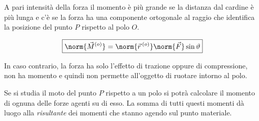 \FloatBarrier
A pari intensità della forza il momento è più grande se la distanza dal cardine è più lunga e c'è se la forza ha una componente ortogonale al raggio che identifica la posizione del punto $P$ rispetto al polo $O$.

\[
	\boxed{\norm{\vec{M}^{(o)}}= \norm{\vec{r}\,^{(o)}} \norm{\vec{F}} \sin\vartheta}
\]

In caso contrario, la forza ha solo l'effetto di trazione oppure di compressione, non ha momento e quindi non permette all'oggetto di ruotare intorno al polo.

Se si studia il moto del punto $P$ rispetto a un polo si potrà calcolare il momento di ognuna delle forze agenti su di esso. La somma di tutti questi momenti dà luogo alla \emph{risultante} dei momenti che stanno agendo sul punto materiale.

